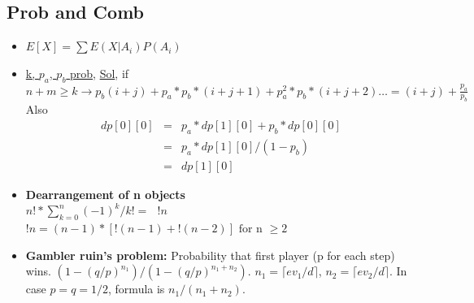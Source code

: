 \documentclass[8pt, a4paper, oneside, twocolumn]{extarticle}
\begin{document}
\subsection{Prob and Comb}
\begin{itemize}
    \item $E[X] = \sum E(X|A_i)P(A_i)$
    \item \href {https://codeforces.com/contest/908/problem/D}{k, $p_a$, $p_b$ prob}, \href {https://github.com/sourabh2311/Competitive-Programming/blob/master/CF/Good%20Bye%202017/D.cpp}{Sol}, if $n + m \geq k \rightarrow p_b(i + j) + p_a*p_b*(i + j + 1) + p_a^2*p_b*(i + j + 2)\dots = (i + j) + \frac{p_a}{p_b}$ Also
    \begin{eqnarray}
    dp[0][0] & = & p_a * dp[1][0] + p_b * dp[0][0]\\
             & = & p_a * dp[1][0] / (1 - p_b)\\
             & = & dp[1][0]
    \end{eqnarray}
    \item \textbf{Dearrangement of n objects}
    \\ $n! * \sum_{k = 0}^n (-1)^k / {k!} =\text{ } !n$
    \\ $!n = (n - 1) * [!(n - 1) + !(n - 2)] \text{ for n }\geq 2$
    \item \textbf{Gambler ruin's problem: }Probability that first player (p for each step) wins. $(1 - (q/p)^{n_1})/(1 - (q/p)^{n_1 + n_2})$. $n_1 = \lceil ev_1/d \rceil$, $n_2 = \lceil ev_2/d \rceil$. In case $p = q = 1/2$, formula is $n_1/(n_1 + n_2)$.

\end{itemize}
\end{document}
